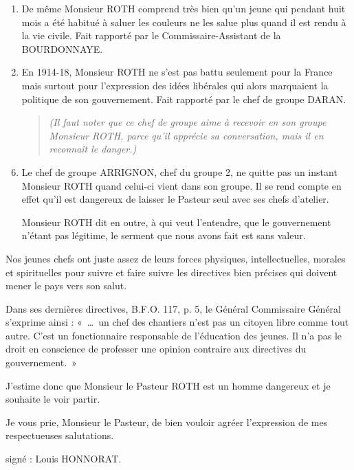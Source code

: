 {\begin{enumerate}
\item
De même Monsieur ROTH comprend très bien qu’un jeune
qui pendant huit mois a été habitué à saluer les couleurs ne les salue
plus quand il est rendu à la vie civile. Fait rapporté par le Commissaire-Assistant de la BOURDONNAYE.

\item
En 1914-18, Monsieur ROTH ne s’est pas battu seulement
pour la France mais surtout pour l’expression des idées libérales qui
alors marquaient la politique de son gouvernement. Fait rapporté par
le chef de groupe DARAN.

\begin{quote}
\emph{(Il faut noter que ce chef de groupe aime à recevoir en son
groupe Monsieur ROTH, parce qu’il apprécie sa conversation, mais il
en reconnaît le danger.)
}
\end{quote}
\end{enumerate}


\newpage
\papierquadrille
\thispagestyle{empty}

\begin{enumerate}
\setcounter{enumi}{5}

\item
Le chef de groupe ARRIGNON, chef du groupe 2, ne quitte
pas un instant Monsieur ROTH quand celui-ci vient dans son groupe.
Il se rend compte en effet qu’il est dangereux de laisser le Pasteur seul
avec ses chefs d’atelier.

Monsieur ROTH dit en outre, à qui veut l’entendre, que le
gouvernement n’étant pas légitime, le serment que nous avons fait est
sans valeur.

\end{enumerate}

Nos jeunes chefs ont juste assez de leurs forces physiques,
intellectuelles, morales et spirituelles pour suivre et faire suivre
les directives bien précises qui doivent mener le pays vers son salut.

Dans ses dernières directives, B.F.O. 117, p. 5, le Général
Commissaire Général s’exprime ainsi : «~\ldots\ un chef des chantiers n’est
pas un citoyen libre comme tout autre. C’est un fonctionnaire responsable de l’éducation des jeunes. Il n’a pas le droit en conscience de professer une opinion contraire aux directives du gouvernement.~»

J’estime donc que Monsieur le Pasteur ROTH est un homme dangereux et je souhaite le voir partir.

Je vous prie, Monsieur le Pasteur, de bien vouloir agréer
l’expression de mes respectueuses salutations.

\begin{flushright}
signé : Louis HONNORAT.
\end{flushright}
}

